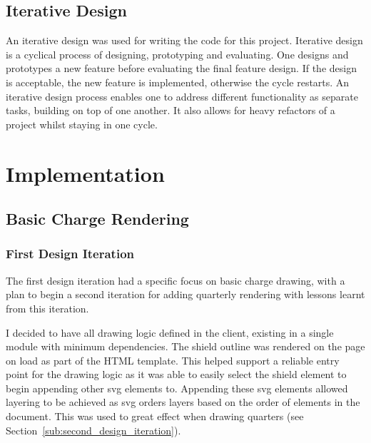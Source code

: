 \documentclass[nobib, a4paper, twoside, justified]{tufte-book}
\makeatletter
\newcommand{\svg}{\gls{svg}\@\xspace}
\newcommand{\charge}{\gls{charge}\@\xspace}
\makeatother
\begin{document}
\section{Iterative Design}%
\label{sec:iterative_design}

An iterative design was used for writing the code for this project. Iterative design is a cyclical
process of designing, prototyping and evaluating. One designs and prototypes a new feature before
evaluating the final feature design. If the design is acceptable, the new feature is implemented,
otherwise the cycle restarts. An iterative design process enables one to address different functionality
as separate tasks, building on top of one another. It also allows for heavy refactors of a project
whilst staying in one cycle.

\chapter{Implementation}%
\label{cha:implementation}

\section{Basic Charge Rendering}%
\label{sub:basic_charge_rendering}

\subsection{First Design Iteration}%
\label{sub:first_design_iteration}

The first design iteration had a specific focus on basic \charge drawing, with a plan to begin a
second iteration for adding quarterly rendering with lessons learnt from this iteration.

I decided to have all drawing logic defined in the client, existing in a single module with minimum
dependencies. The shield outline was rendered on the page on load as part of the HTML template.
This helped support a reliable entry point for the drawing logic as it was able to easily select
the shield element to begin appending other \svg elements to. Appending these \svg elements
allowed layering to be achieved as \svg orders layers based on the order of elements in the
document. This was used to great effect when drawing quarters (see
Section~\ref{sub:second_design_iteration}).
\end{document}
